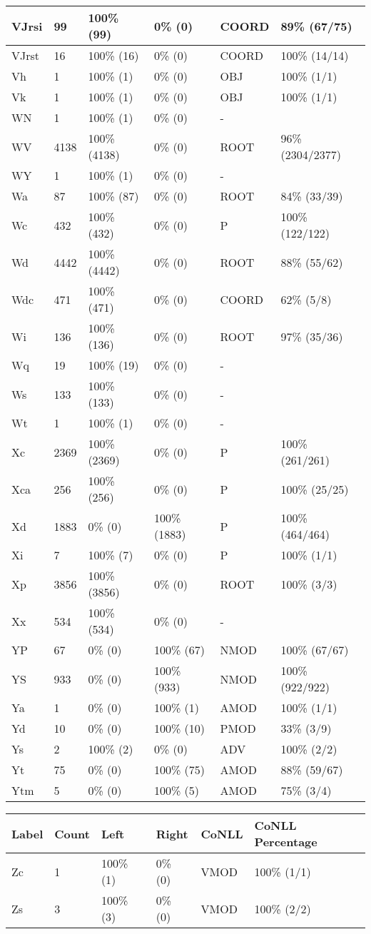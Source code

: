 \begin{figure*}
\begin{tabular}{|l|l|l|l||l|l|}
 VJrsi & 99 & 100\% (99) & 0\% (0) & COORD & 89\% (67/75) \\ 
\hline
 VJrst & 16 & 100\% (16) & 0\% (0) & COORD & 100\% (14/14) \\ 
\hline
 Vh & 1 & 100\% (1) & 0\% (0) & OBJ & 100\% (1/1) \\ 
\hline
 Vk & 1 & 100\% (1) & 0\% (0) & OBJ & 100\% (1/1) \\ 
\hline
 WN & 1 & 100\% (1) & 0\% (0) & - &  \\ 
\hline
 WV & 4138 & 100\% (4138) & 0\% (0) & ROOT & 96\% (2304/2377) \\ 
\hline
 WY & 1 & 100\% (1) & 0\% (0) & - &  \\ 
\hline
 Wa & 87 & 100\% (87) & 0\% (0) & ROOT & 84\% (33/39) \\ 
\hline
 Wc & 432 & 100\% (432) & 0\% (0) & P & 100\% (122/122) \\ 
\hline
 Wd & 4442 & 100\% (4442) & 0\% (0) & ROOT & 88\% (55/62) \\ 
\hline
 Wdc & 471 & 100\% (471) & 0\% (0) & COORD & 62\% (5/8) \\ 
\hline
 Wi & 136 & 100\% (136) & 0\% (0) & ROOT & 97\% (35/36) \\ 
\hline
 Wq & 19 & 100\% (19) & 0\% (0) & - &  \\ 
\hline
 Ws & 133 & 100\% (133) & 0\% (0) & - &  \\ 
\hline
 Wt & 1 & 100\% (1) & 0\% (0) & - &  \\ 
\hline
 Xc & 2369 & 100\% (2369) & 0\% (0) & P & 100\% (261/261) \\ 
\hline
 Xca & 256 & 100\% (256) & 0\% (0) & P & 100\% (25/25) \\ 
\hline
 Xd & 1883 & 0\% (0) & 100\% (1883) & P & 100\% (464/464) \\ 
\hline
 Xi & 7 & 100\% (7) & 0\% (0) & P & 100\% (1/1) \\ 
\hline
 Xp & 3856 & 100\% (3856) & 0\% (0) & ROOT & 100\% (3/3) \\ 
\hline
 Xx & 534 & 100\% (534) & 0\% (0) & - &  \\ 
\hline
 YP & 67 & 0\% (0) & 100\% (67) & NMOD & 100\% (67/67) \\ 
\hline
 YS & 933 & 0\% (0) & 100\% (933) & NMOD & 100\% (922/922) \\ 
\hline
 Ya & 1 & 0\% (0) & 100\% (1) & AMOD & 100\% (1/1) \\ 
\hline
 Yd & 10 & 0\% (0) & 100\% (10) & PMOD & 33\% (3/9) \\ 
\hline
 Ys & 2 & 100\% (2) & 0\% (0) & ADV & 100\% (2/2) \\ 
\hline
 Yt & 75 & 0\% (0) & 100\% (75) & AMOD & 88\% (59/67) \\ 
\hline
 Ytm & 5 & 0\% (0) & 100\% (5) & AMOD & 75\% (3/4) \\ 
\hline
\end{tabular}
\end{figure*}
\begin{figure*}
\begin{tabular}{|l|l|l|l||l|l|}
\hline
Label & Count & Left & Right & CoNLL & CoNLL Percentage\\ 
\hline
 Zc & 1 & 100\% (1) & 0\% (0) & VMOD & 100\% (1/1) \\ 
\hline
 Zs & 3 & 100\% (3) & 0\% (0) & VMOD & 100\% (2/2) \\ 
\hline
\end{tabular}
\end{figure*}
